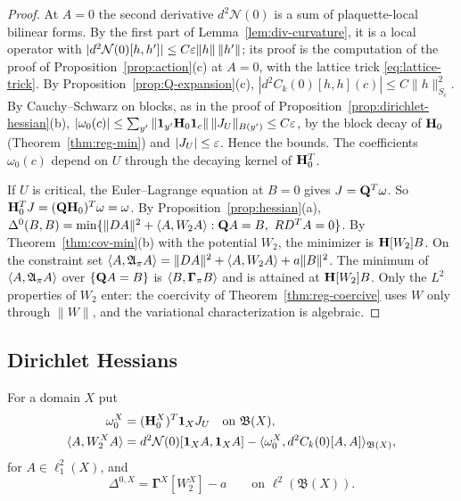 \begin{proof}
At $A=0$ the second derivative $d^2\mathcal N(0)$ is a sum of plaquette-local bilinear forms. By the first part of Lemma~\ref{lem:div-curvature}, it is a local operator with $|d^2\mathcal N(0)[h,h']|\le C\varepsilon\|h\|\,\|h'\|$; its proof is the computation of the proof of Proposition~\ref{prop:action}(c) at $A=0$, with the lattice trick \eqref{eq:lattice-trick}. By Proposition~\ref{prop:Q-expansion}(c), $|d^2C_k(0)[h,h](c)|\le C\|h\|^2_{S_c}$. By Cauchy--Schwarz on blocks, as in the proof of Proposition~\ref{prop:dirichlet-hessian}(b), $|\omega_0(c)|\le\sum_{y'}\|\mathbf 1_{y'}\mathbf H_0\mathbf 1_c\|\,\|J_U\|_{B(y')}\le C\varepsilon$, by the block decay of $\mathbf H_0$ (Theorem~\ref{thm:reg-min}) and $|J_U|\le\varepsilon$. Hence the bounds. The coefficients $\omega_0(c)$ depend on $U$ through the decaying kernel of $\mathbf H_0^T$.

If $U$ is critical, the Euler--Lagrange equation at $B=0$ gives $J=\mathbf Q^T\omega$. So $\mathbf H_0^TJ=(\mathbf Q\mathbf H_0)^T\omega=\omega$. By Proposition~\ref{prop:hessian}(a), $\Delta^0(B,B)=\min\{\|DA\|^2+\ip A{W_2A}:\bQ A=B,\ RD^TA=0\}$. By Theorem~\ref{thm:cov-min}(b) with the potential $W_2$, the minimizer is $\mathbf H[W_2]B$. On the constraint set $\langle A,\mathfrak A_\pi A\rangle=\|DA\|^2+\langle A,W_2A\rangle+a\|B\|^2$. The minimum of $\langle A,\mathfrak A_\pi A\rangle$ over $\{\mathbf Q A=B\}$ is $\langle B,\boldsymbol\Gamma_\pi B\rangle$ and is attained at $\mathbf H[W_2]B$. Only the $L^2$ properties of $W_2$ enter: the coercivity of Theorem~\ref{thm:reg-coercive} uses $W$ only through $\|W\|$, and the variational characterization is algebraic.
\end{proof}

\subsection{Dirichlet Hessians}

\begin{definition}\label{def:dirichlet-hessian}
For a domain $X$ put
\[
\begin{aligned}
\omega_0^X&=(\mathbf H_0^X)^T\mathbf 1_XJ_U\quad\text{on }\mathfrak B(X),\\
\langle A,W_2^XA\rangle&=d^2\mathcal N(0)[\mathbf 1_XA,\mathbf 1_XA]-\langle \omega_0^X,d^2C_k(0)[A,A]\rangle_{\mathfrak B(X)},
\end{aligned}
\]
for $A\in\ell^2_1(X)$, and
\[
\Delta^{0,X}=\boldsymbol\Gamma^X[W_2^X]-a\qquad\text{on }\ell^2(\mathfrak B(X)).
\]
\end{definition}

